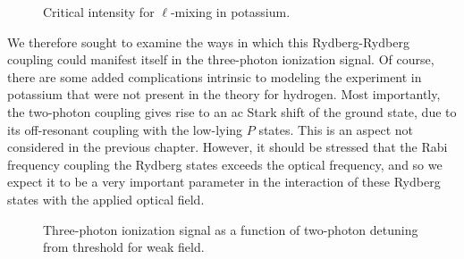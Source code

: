 \begin{figure}[tbp]
\bigskip
{}
{Critical intensity for $\ell$-mixing in potassium.
\label{inten_K}}
\end{figure}

We therefore sought to examine the ways in which this Rydberg-Rydberg coupling
could manifest itself in the three-photon ionization signal.  Of course, there
are some added complications intrinsic to modeling the experiment in
potassium that were not present in the theory for hydrogen.  Most
importantly, the two-photon coupling gives rise to an ac Stark shift of the
ground state, due to its off-resonant coupling with the low-lying $P$ states. 
This is an aspect not considered in the previous chapter.  However, it should be
stressed that the Rabi frequency coupling the Rydberg states exceeds the optical
frequency, and so we expect it to be a very important parameter in the
interaction of these Rydberg states with the applied optical field.

\begin{figure}[tbp]
\bigskip
{} {Three-photon ionization signal as a function of
two-photon detuning from threshold for weak field.
\label{weak}}
\end{figure}

